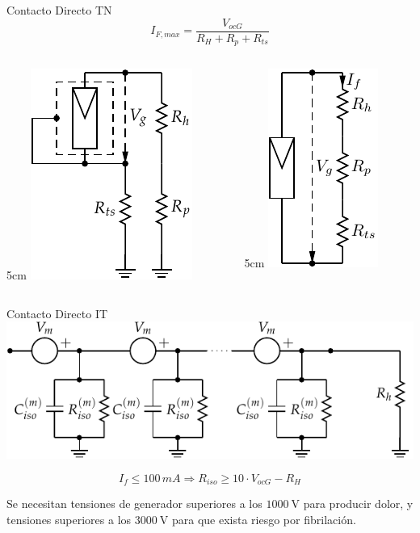 \documentclass[xcolor={usenames,svgnames,dvipsnames}]{beamer}
\begin{document}
\begin{frame}[label=sec-2-2-2]{Contacto Directo TN}
$$I_{F,max}=\frac{V_{ocG}}{R_{H}+R_{p}+R_{ts}}$$

\begin{columns}
\begin{column}{5cm\textwidth}
\includegraphics[height=0.5\textheight]{../figs/ContactoDirectoTN.pdf}
\end{column}

\begin{column}{5cm\textwidth}
\includegraphics[height=0.5\textheight]{../figs/ContactoDirectoTT_simple.pdf}
\end{column}
\end{columns}
\end{frame}


\begin{frame}[label=sec-2-2-3]{Contacto Directo IT}
\includegraphics[width=.9\linewidth]{../figs/ContactoDirectoIT_Capacidad.pdf}

$$I_{f}\leq100\, mA\Longrightarrow R_{iso}\geq10\cdot V_{ocG}-R_{H}$$

Se necesitan tensiones de generador superiores a los $\SI{1000}{\volt}$
para producir dolor, y tensiones superiores a los $\SI{3000}{\volt}$
para que exista riesgo por fibrilación.
\end{frame}
\end{document}
